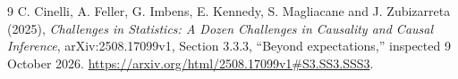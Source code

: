 \documentclass[11pt]{article}
\theoremstyle{remark}
\begin{document}
\begin{thebibliography}{9}
 C. Cinelli, A. Feller, G. Imbens, E. Kennedy, S. Magliacane and J. Zubizarreta (2025), \emph{Challenges in Statistics: A Dozen Challenges in Causality and Causal Inference}, arXiv:2508.17099v1, Section 3.3.3, ``Beyond expectations,'' inspected 9 October 2026. \url{https://arxiv.org/html/2508.17099v1#S3.SS3.SSS3}.
\end{thebibliography}
\end{document}
